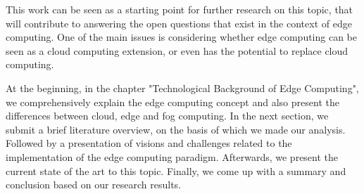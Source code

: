 This work can be seen as a starting point for further research on this topic, that will contribute to answering the open questions that exist in the context of edge computing. One of the main issues is considering whether edge computing can be seen as a cloud computing extension, or even has the potential to replace cloud computing.\par
At the beginning, in the chapter "Technological Background of Edge Computing", we comprehensively explain the edge computing concept and also present the differences between cloud, edge and fog computing. In the next section, we submit a brief literature overview, on the basis of which we made our analysis. Followed by a presentation of visions and challenges related to the implementation of the edge computing paradigm. Afterwards, we present the current state of the art to this topic. Finally, we come up with a summary and conclusion based on our research results.\par
